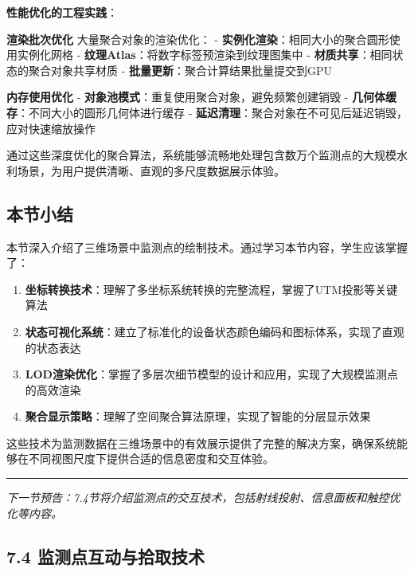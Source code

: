 \textbf{性能优化的工程实践}：

\textbf{渲染批次优化} 大量聚合对象的渲染优化： - \textbf{实例化渲染}：相同大小的聚合圆形使用实例化网格 - \textbf{纹理Atlas}：将数字标签预渲染到纹理图集中 - \textbf{材质共享}：相同状态的聚合对象共享材质 - \textbf{批量更新}：聚合计算结果批量提交到GPU

\textbf{内存使用优化} - \textbf{对象池模式}：重复使用聚合对象，避免频繁创建销毁 - \textbf{几何体缓存}：不同大小的圆形几何体进行缓存 - \textbf{延迟清理}：聚合对象在不可见后延迟销毁，应对快速缩放操作

通过这些深度优化的聚合算法，系统能够流畅地处理包含数万个监测点的大规模水利场景，为用户提供清晰、直观的多尺度数据展示体验。

\subsection{本节小结}\label{ux672cux8282ux5c0fux7ed3-2}

本节深入介绍了三维场景中监测点的绘制技术。通过学习本节内容，学生应该掌握了：

\begin{enumerate}
\def\labelenumi{\arabic{enumi}.}
\tightlist
\item
  \textbf{坐标转换技术}：理解了多坐标系统转换的完整流程，掌握了UTM投影等关键算法
\item
  \textbf{状态可视化系统}：建立了标准化的设备状态颜色编码和图标体系，实现了直观的状态表达
\item
  \textbf{LOD渲染优化}：掌握了多层次细节模型的设计和应用，实现了大规模监测点的高效渲染
\item
  \textbf{聚合显示策略}：理解了空间聚合算法原理，实现了智能的分层显示效果
\end{enumerate}

这些技术为监测数据在三维场景中的有效展示提供了完整的解决方案，确保系统能够在不同视图尺度下提供合适的信息密度和交互体验。

\begin{center}\rule{0.5\linewidth}{0.5pt}\end{center}

\emph{下一节预告：7.4节将介绍监测点的交互技术，包括射线投射、信息面板和触控优化等内容。}

\subsection{7.4 监测点互动与拾取技术}\label{ux76d1ux6d4bux70b9ux4e92ux52a8ux4e0eux62feux53d6ux6280ux672f}

